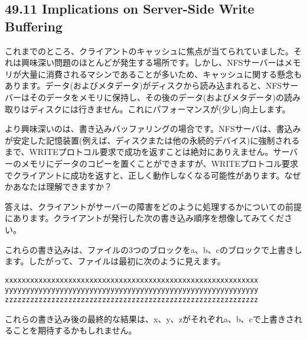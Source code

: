 \hypertarget{implications-on-server-side-write-buffering}{%
\subsection*{49.11 Implications on Server-Side Write
Buffering}\label{implications-on-server-side-write-buffering}}

これまでのところ、クライアントのキャッシュに焦点が当てられていました。それは興味深い問題のほとんどが発生する場所です。しかし、NFSサーバーはメモリが大量に消費されるマシンであることが多いため、キャッシュに関する懸念もあります。データ(およびメタデータ)がディスクから読み込まれると、NFSサーバーはそのデータをメモリに保持し、その後のデータ(およびメタデータ)の読み取りはディスクには行きません。これにパフォーマンスが(少し)向上します。

より興味深いのは、書き込みバッファリングの場合です。NFSサーバは、書込みが安定した記憶装置(例えば、ディスクまたは他の永続的デバイス)に強制されるまで、WRITEプロトコル要求で成功を返すことは絶対にありえません。サーバーのメモリにデータのコピーを置くことができますが、WRITEプロトコル要求でクライアントに成功を返すと、正しく動作しなくなる可能性があります。なぜかあなたは理解できますか？

答えは、クライアントがサーバーの障害をどのように処理するかについての前提にあります。クライアントが発行した次の書き込み順序を想像してみてください。

\begin{Shaded}
\begin{Highlighting}[]
\end{Highlighting}
\end{Shaded}

これらの書き込みは、ファイルの3つのブロックをa、b、cのブロックで上書きします。したがって、ファイルは最初に次のように見えます。

\begin{verbatim}
xxxxxxxxxxxxxxxxxxxxxxxxxxxxxxxxxxxxxxxxxxxxxxxxxxxxxxxxxxxx
yyyyyyyyyyyyyyyyyyyyyyyyyyyyyyyyyyyyyyyyyyyyyyyyyyyyyyyyyyyy
zzzzzzzzzzzzzzzzzzzzzzzzzzzzzzzzzzzzzzzzzzzzzzzzzzzzzzzzzzzz
\end{verbatim}

これらの書き込み後の最終的な結果は、x、y、zがそれぞれa、b、cで上書きされることを期待するかもしれません。

